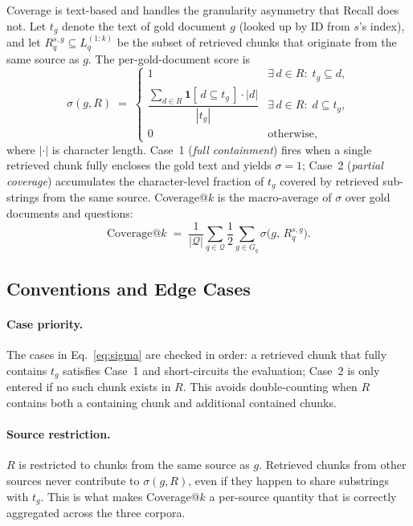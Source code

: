 Coverage is text-based and handles the granularity asymmetry that
Recall does not. Let $t_g$ denote the text of gold document $g$
(looked up by ID from $s$'s index), and let
$R_q^{s,g} \subseteq L_q^{(1:k)}$ be the subset of retrieved chunks
that originate from the same source as $g$. The per-gold-document
score is
\begin{equation}
\label{eq:sigma}
\sigma(g, R) \;=\;
\begin{cases}
1 & \exists\,d \in R:\; t_g \subseteq d, \\[6pt]
\dfrac{\displaystyle\sum_{d \in R}\mathbf{1}[\,d \subseteq t_g\,]\cdot|d|}{|t_g|}
  & \exists\,d \in R:\; d \subseteq t_g, \\[10pt]
0 & \text{otherwise,}
\end{cases}
\end{equation}
where $|\cdot|$ is character length. Case~1 (\emph{full containment})
fires when a single retrieved chunk fully encloses the gold text and
yields $\sigma{=}1$; Case~2 (\emph{partial coverage}) accumulates the
character-level fraction of $t_g$ covered by retrieved sub-strings
from the same source. Coverage@$k$ is the macro-average of $\sigma$
over gold documents and questions:
\begin{equation}
\label{eq:coverage}
\text{Coverage@}k \;=\; \frac{1}{|\mathcal{Q}|}\sum_{q \in \mathcal{Q}}
\frac{1}{2}\sum_{g \in G_q} \sigma\!\bigl(g,\, R_q^{s,g}\bigr).
\end{equation}

\subsection{Conventions and Edge Cases}
\label{sec:appendix-metrics-edge}

\paragraph{Case priority.} The cases in Eq.~\ref{eq:sigma} are checked
in order: a retrieved chunk that fully contains $t_g$ satisfies
Case~1 and short-circuits the evaluation; Case~2 is only entered if
no such chunk exists in $R$. This avoids double-counting when $R$
contains both a containing chunk and additional contained chunks.

\paragraph{Source restriction.} $R$ is restricted to chunks from the
same source as $g$. Retrieved chunks from other sources never
contribute to $\sigma(g, R)$, even if they happen to share
substrings with $t_g$. This is what makes Coverage@$k$ a per-source
quantity that is correctly aggregated across the three corpora.

